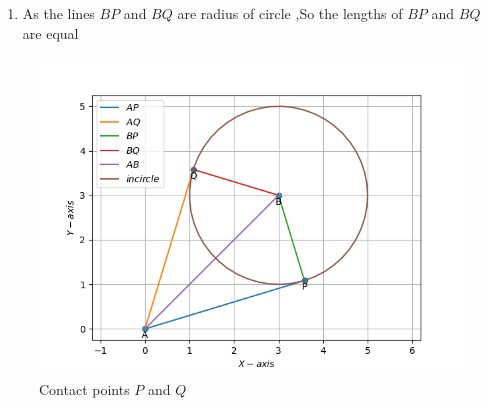 \documentclass[11pt, a4paper]{article}
\begin{document}
\begin{enumerate}
\begin{enumerate}
\item As the lines $BP$ and $BQ$ are radius of circle ,So the lengths of  $BP$ and $BQ$ are  equal 
\end{enumerate}

\begin{figure}[H]
    \centering
    \includegraphics[width=1\columnwidth]{eigen.png}
    \caption{Contact points $P$ and $Q$}
    \label{fig:eigen}
\end{figure}

\end{enumerate}
\end{document}

